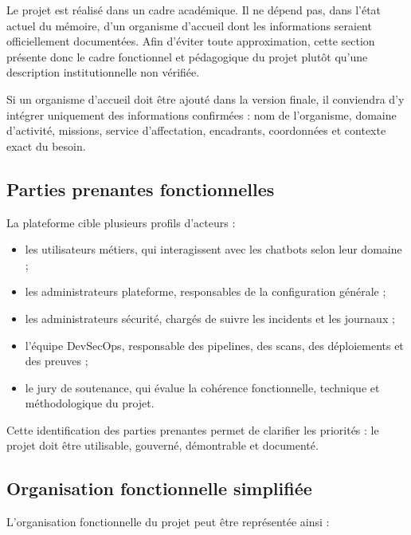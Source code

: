 Le projet est réalisé dans un cadre académique. Il ne dépend pas, dans l'état actuel du mémoire, d'un organisme d'accueil dont les informations seraient officiellement documentées. Afin d'éviter toute approximation, cette section présente donc le cadre fonctionnel et pédagogique du projet plutôt qu'une description institutionnelle non vérifiée.

Si un organisme d'accueil doit être ajouté dans la version finale, il conviendra d'y intégrer uniquement des informations confirmées : nom de l'organisme, domaine d'activité, missions, service d'affectation, encadrants, coordonnées et contexte exact du besoin.

\subsection{Parties prenantes fonctionnelles}

La plateforme cible plusieurs profils d'acteurs :

\begin{itemize}
    \item les utilisateurs métiers, qui interagissent avec les chatbots selon leur domaine ;
    \item les administrateurs plateforme, responsables de la configuration générale ;
    \item les administrateurs sécurité, chargés de suivre les incidents et les journaux ;
    \item l'équipe DevSecOps, responsable des pipelines, des scans, des déploiements et des preuves ;
    \item le jury de soutenance, qui évalue la cohérence fonctionnelle, technique et méthodologique du projet.
\end{itemize}

Cette identification des parties prenantes permet de clarifier les priorités : le projet doit être utilisable, gouverné, démontrable et documenté.

\subsection{Organisation fonctionnelle simplifiée}

L'organisation fonctionnelle du projet peut être représentée ainsi :

